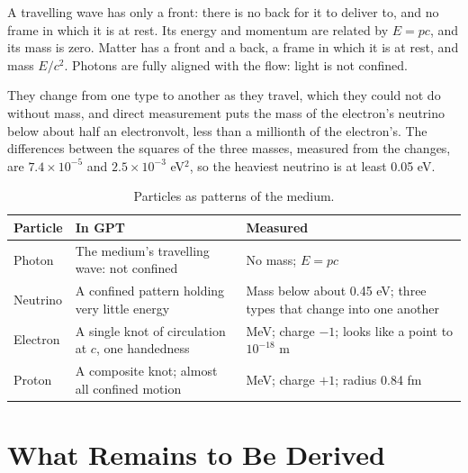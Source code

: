 \documentclass[11pt,a4paper]{article}
\begin{document}
 A travelling wave has only a front: there is no back for it to deliver to, and no frame in which it is at rest. Its energy and momentum are related by $E = pc$, and its mass is zero. Matter has a front and a back, a frame in which it is at rest, and mass $E/c^2$. Photons are fully aligned with the flow: light is not confined.

 They change from one type to another as they travel, which they could not do without mass, and direct measurement puts the mass of the electron's neutrino below about half an electronvolt, less than a millionth of the electron's. The differences between the squares of the three masses, measured from the changes, are $7.4\times10^{-5}$ and $2.5\times10^{-3}$ eV$^2$, so the heaviest neutrino is at least 0.05 eV. 

\begin{table}[H]
\centering
\small
\renewcommand{\arraystretch}{1.25}
\begin{tabular}{@{}>{\raggedright\arraybackslash}p{}>{\raggedright\arraybackslash}p{}>{\raggedright\arraybackslash}p{}@{}}
\toprule
\textbf{Particle} & \textbf{In GPT} & \textbf{Measured} \\
\midrule
Photon & The medium's travelling wave: not confined & No mass; $E = pc$ \\
Neutrino & A confined pattern holding very little energy & Mass below about 0.45 eV; three types that change into one another \\
Electron & A single knot of circulation at $c$, one handedness & 0.511 MeV; charge $-1$; looks like a point to $10^{-18}$ m \\
Proton & A composite knot; almost all confined motion & 938 MeV; charge $+1$; radius 0.84 fm \\
\bottomrule
\end{tabular}
\caption{Particles as patterns of the medium. \hyptag}
\label{tab:particles}
\end{table}

\section{What Remains to Be Derived}
\label{sec:owed}
\end{document}
